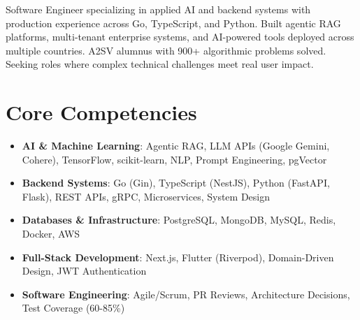 \documentclass[11pt,a4paper,sans]{moderncv}
\begin{document}
\makecvtitle


\vspace{6pt}
\small{Software Engineer specializing in applied AI and backend systems with production experience across Go, TypeScript, and Python. Built agentic RAG platforms, multi-tenant enterprise systems, and AI-powered tools deployed across multiple countries. A2SV alumnus with 900+ algorithmic problems solved. Seeking roles where complex technical challenges meet real user impact.}


\section{Core Competencies}
\vspace{1pt}
\begin{itemize}

\item \textbf{AI \& Machine Learning}: Agentic RAG, LLM APIs (Google Gemini, Cohere), TensorFlow, scikit-learn, NLP, Prompt Engineering, pgVector

\item \textbf{Backend Systems}: Go (Gin), TypeScript (NestJS), Python (FastAPI, Flask), REST APIs, gRPC, Microservices, System Design

\item \textbf{Databases \& Infrastructure}: PostgreSQL, MongoDB, MySQL, Redis, Docker, AWS

\item \textbf{Full-Stack Development}: Next.js, Flutter (Riverpod), Domain-Driven Design, JWT Authentication

\item \textbf{Software Engineering}: Agile/Scrum, PR Reviews, Architecture Decisions, Test Coverage (60-85\%)

\end{itemize}

\end{document}
